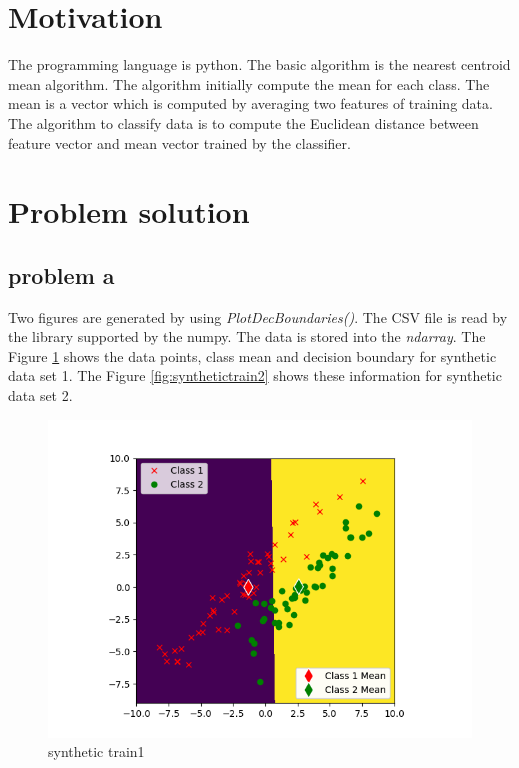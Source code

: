 \documentclass{article}
\begin{document}
	\section{Motivation}
	The programming language is python. The basic algorithm is the nearest centroid mean algorithm. The algorithm initially compute the mean for each class. The mean is a vector which is computed by averaging two features of training data. The algorithm to classify data is to compute the Euclidean distance between feature vector and  mean vector trained by the classifier. 	 
	\section{Problem solution}
	\subsection{problem a}
	Two figures are generated by using \textit{PlotDecBoundaries()}. The CSV file is read by the library supported by the numpy. The data is stored into the \textit{ndarray}.  The Figure \ref{fig:synthetictrain1} shows the data points, class mean and decision boundary for synthetic data set 1. The Figure \ref{fig:synthetictrain2} shows these information for synthetic data set 2. 
	\begin{figure}[hbt!]
		\includegraphics[width=\linewidth]{images/synthetic_trian1.png}	
		\caption{synthetic train1}
		\label{fig:synthetictrain1}
	\end{figure}
\end{document}
